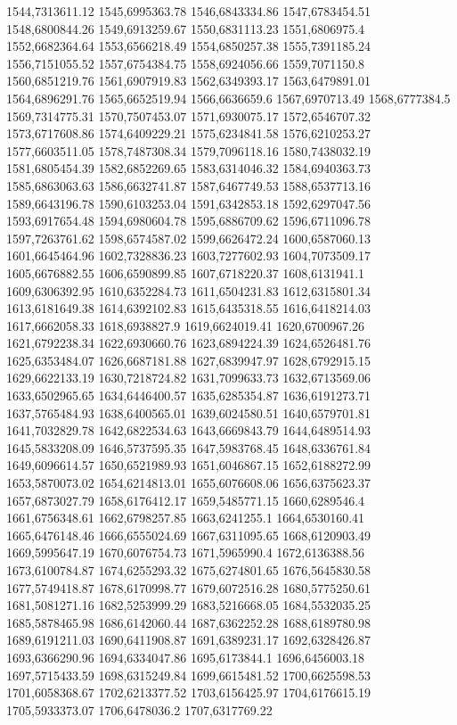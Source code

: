 1544,7313611.12
1545,6995363.78
1546,6843334.86
1547,6783454.51
1548,6800844.26
1549,6913259.67
1550,6831113.23
1551,6806975.4
1552,6682364.64
1553,6566218.49
1554,6850257.38
1555,7391185.24
1556,7151055.52
1557,6754384.75
1558,6924056.66
1559,7071150.8
1560,6851219.76
1561,6907919.83
1562,6349393.17
1563,6479891.01
1564,6896291.76
1565,6652519.94
1566,6636659.6
1567,6970713.49
1568,6777384.5
1569,7314775.31
1570,7507453.07
1571,6930075.17
1572,6546707.32
1573,6717608.86
1574,6409229.21
1575,6234841.58
1576,6210253.27
1577,6603511.05
1578,7487308.34
1579,7096118.16
1580,7438032.19
1581,6805454.39
1582,6852269.65
1583,6314046.32
1584,6940363.73
1585,6863063.63
1586,6632741.87
1587,6467749.53
1588,6537713.16
1589,6643196.78
1590,6103253.04
1591,6342853.18
1592,6297047.56
1593,6917654.48
1594,6980604.78
1595,6886709.62
1596,6711096.78
1597,7263761.62
1598,6574587.02
1599,6626472.24
1600,6587060.13
1601,6645464.96
1602,7328836.23
1603,7277602.93
1604,7073509.17
1605,6676882.55
1606,6590899.85
1607,6718220.37
1608,6131941.1
1609,6306392.95
1610,6352284.73
1611,6504231.83
1612,6315801.34
1613,6181649.38
1614,6392102.83
1615,6435318.55
1616,6418214.03
1617,6662058.33
1618,6938827.9
1619,6624019.41
1620,6700967.26
1621,6792238.34
1622,6930660.76
1623,6894224.39
1624,6526481.76
1625,6353484.07
1626,6687181.88
1627,6839947.97
1628,6792915.15
1629,6622133.19
1630,7218724.82
1631,7099633.73
1632,6713569.06
1633,6502965.65
1634,6446400.57
1635,6285354.87
1636,6191273.71
1637,5765484.93
1638,6400565.01
1639,6024580.51
1640,6579701.81
1641,7032829.78
1642,6822534.63
1643,6669843.79
1644,6489514.93
1645,5833208.09
1646,5737595.35
1647,5983768.45
1648,6336761.84
1649,6096614.57
1650,6521989.93
1651,6046867.15
1652,6188272.99
1653,5870073.02
1654,6214813.01
1655,6076608.06
1656,6375623.37
1657,6873027.79
1658,6176412.17
1659,5485771.15
1660,6289546.4
1661,6756348.61
1662,6798257.85
1663,6241255.1
1664,6530160.41
1665,6476148.46
1666,6555024.69
1667,6311095.65
1668,6120903.49
1669,5995647.19
1670,6076754.73
1671,5965990.4
1672,6136388.56
1673,6100784.87
1674,6255293.32
1675,6274801.65
1676,5645830.58
1677,5749418.87
1678,6170998.77
1679,6072516.28
1680,5775250.61
1681,5081271.16
1682,5253999.29
1683,5216668.05
1684,5532035.25
1685,5878465.98
1686,6142060.44
1687,6362252.28
1688,6189780.98
1689,6191211.03
1690,6411908.87
1691,6389231.17
1692,6328426.87
1693,6366290.96
1694,6334047.86
1695,6173844.1
1696,6456003.18
1697,5715433.59
1698,6315249.84
1699,6615481.52
1700,6625598.53
1701,6058368.67
1702,6213377.52
1703,6156425.97
1704,6176615.19
1705,5933373.07
1706,6478036.2
1707,6317769.22
